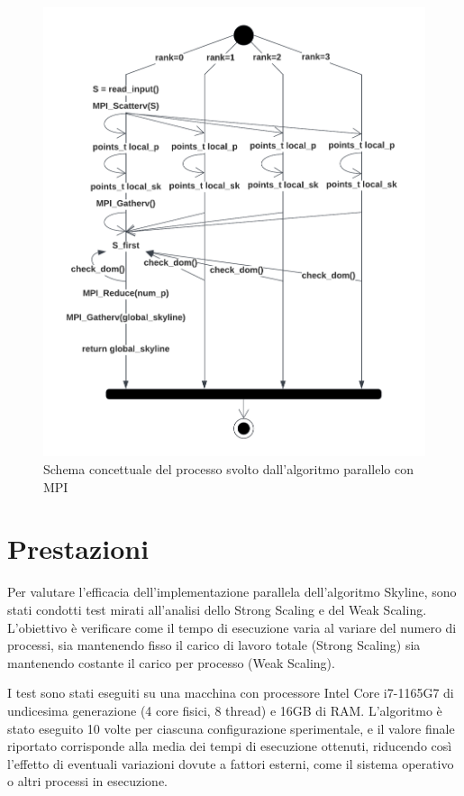 \documentclass[letterpaper,11pt,leqno]{article}
\begin{document}
\begin{figure}[h]
    \centering
    \includegraphics[scale=0.6]{MPI.pdf}
    \caption{Schema concettuale del processo svolto dall'algoritmo parallelo con MPI}
    \label{f:graph2}
\end{figure}




\section{Prestazioni}

Per valutare l'efficacia dell'implementazione parallela dell'algoritmo Skyline, sono stati condotti test mirati all'analisi dello Strong Scaling e del Weak Scaling. L'obiettivo è verificare come il tempo di esecuzione varia al variare del numero di processi, sia mantenendo fisso il carico di lavoro totale (Strong Scaling) sia mantenendo costante il carico per processo (Weak Scaling).  

I test sono stati eseguiti su una macchina con processore Intel Core i7-1165G7 di undicesima generazione (4 core fisici, 8 thread) e 16GB di RAM. L'algoritmo è stato eseguito 10 volte per ciascuna configurazione sperimentale, e il valore finale riportato corrisponde alla media dei tempi di esecuzione ottenuti, riducendo così l'effetto di eventuali variazioni dovute a fattori esterni, come il sistema operativo o altri processi in esecuzione.  
\end{document}
